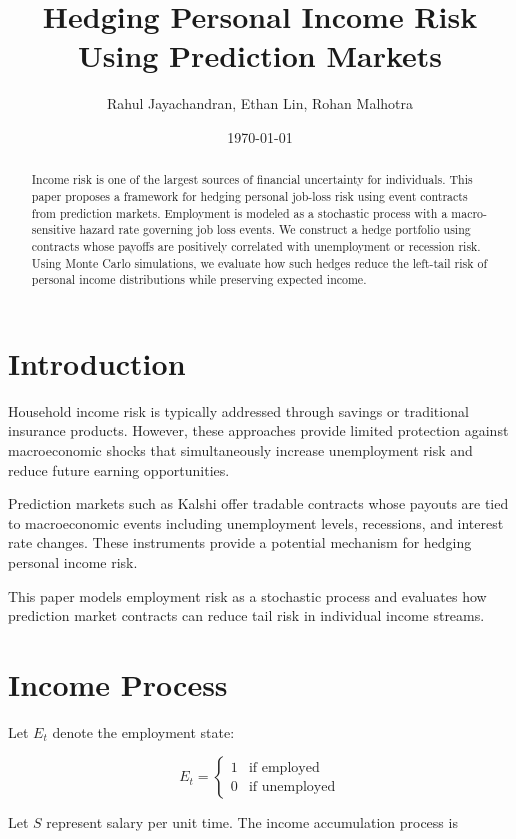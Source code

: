\documentclass[11pt]{article}
\title{Hedging Personal Income Risk Using Prediction Markets}
\author{Rahul Jayachandran, Ethan Lin, Rohan Malhotra}
\date{\today}
\begin{document}
\maketitle

\begin{abstract}
Income risk is one of the largest sources of financial uncertainty for individuals. 
This paper proposes a framework for hedging personal job-loss risk using event 
contracts from prediction markets. Employment is modeled as a stochastic process 
with a macro-sensitive hazard rate governing job loss events. We construct a hedge 
portfolio using contracts whose payoffs are positively correlated with unemployment 
or recession risk. Using Monte Carlo simulations, we evaluate how such hedges reduce 
the left-tail risk of personal income distributions while preserving expected income.
\end{abstract}

\section{Introduction}

Household income risk is typically addressed through savings or traditional 
insurance products. However, these approaches provide limited protection against 
macroeconomic shocks that simultaneously increase unemployment risk and reduce 
future earning opportunities. 

Prediction markets such as Kalshi offer tradable contracts whose payouts are 
tied to macroeconomic events including unemployment levels, recessions, and 
interest rate changes. These instruments provide a potential mechanism for 
hedging personal income risk.

This paper models employment risk as a stochastic process and evaluates how 
prediction market contracts can reduce tail risk in individual income streams.

\section{Income Process}

Let $E_t$ denote the employment state:

\[
E_t =
\begin{cases}
1 & \text{if employed} \\
0 & \text{if unemployed}
\end{cases}
\]

Let $S$ represent salary per unit time. The income accumulation process is
\end{document}
